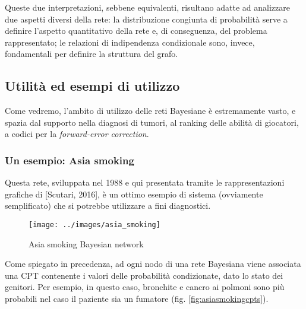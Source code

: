 Queste due interpretazioni, sebbene equivalenti, risultano adatte ad analizzare due aspetti diversi della rete: la distribuzione congiunta di probabilità serve a definire l'aspetto quantitativo della rete e, di conseguenza, del problema rappresentato; le relazioni di indipendenza condizionale sono, invece, fondamentali per definire la struttura del grafo.


%


\subsection{Utilità ed esempi di utilizzo}
Come vedremo, l'ambito di utilizzo delle reti Bayesiane è estremamente vasto, e spazia dal supporto nella diagnosi di tumori\cite{kalet2017}, al ranking delle abilità di giocatori\cite{msr_trueskill}, a codici per la \textit{forward-error correction}\cite{turbocode}.

\subsubsection{Un esempio: Asia smoking}
Questa rete, sviluppata nel 1988\cite{lauritzen1988local} e qui presentata tramite le rappresentazioni grafiche di [Scutari, 2016]\cite{asiasmoking}, è un ottimo esempio di sistema (ovviamente semplificato) che si potrebbe utilizzare a fini diagnostici.
\begin{figure}[H]
	\centering
	\texttt{[image: ../images/asia\_smoking]}
	\caption[Asia smoking Bayesian network]{Asia smoking Bayesian network}
	\label{fig:asiasmoking}
\end{figure}

Come spiegato in precedenza, ad ogni nodo di una rete Bayesiana viene associata una CPT contenente i valori delle probabilità condizionate, dato lo stato dei genitori. Per esempio, in questo caso, bronchite e cancro ai polmoni sono più probabili nel caso il paziente sia un fumatore (fig. \ref{fig:asiasmokingcpts}).

